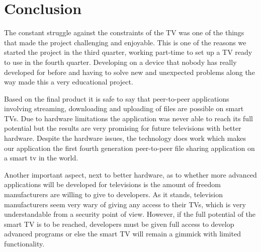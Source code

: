 \chapter{Conclusion}
The constant struggle against the constraints of the TV was one of the things that made the project challenging and enjoyable. This is one of the reasons we started the project in the third quarter, working part-time to set up a TV ready to use in the fourth quarter. Developing on a device that nobody has really developed for before and having to solve new and unexpected problems along the way made this a very educational project.

Based on the final product it is safe to say that peer-to-peer applications involving streaming, downloading and uploading of files are possible on smart TV\textquotesingle s. Due to hardware limitations the application was never able to reach its full potential but the results are very promising for future televisions with better hardware. Despite the hardware issues, the technology does work which makes our application the first fourth generation peer-to-peer file sharing application on a smart tv in the world.

Another important aspect, next to better hardware, as to whether more advanced applications will be developed for televisions is the amount of freedom manufacturers are willing to give to developers. As it stands, television manufacturers seem very wary of giving any access to their TV\textquotesingle s, which is very understandable from a security point of view. However, if the full potential of the smart TV is to be reached, developers must be given full access to develop advanced programs or else the smart TV will remain a gimmick with limited functionality.
